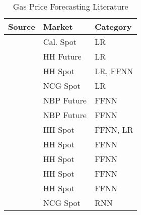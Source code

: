 \begin{table}[H]
	\begin{center}
			\begin{tabular}{l | l | l}
		 		Source & Market &  Category \\
				\hline
				\cite{woo_market_2006} &  Cal. Spot  &LR \\
				\cite{mu_weather_2007} &  HH Future  &LR \\
				\cite{malliaris_forecasting_2008} &  HH Spot  &LR, FFNN \\
				\cite{nick_what_2014} &  NCG Spot  &LR \\				
				\cite{nguyen_combining_2008} &  NBP Future  &FFNN \\
				\cite{nguyen_short-term_2010} &  NBP Future  &FFNN \\		
				\cite{abrishami_different_2011} &  HH Spot  &FFNN, LR \\
				\cite{panella_forecasting_2012} & HH Spot  & FFNN \\
				\cite{jin_forecasting_2015} & HH Spot  & FFNN \\
				\cite{ceperic_short-term_2017} & HH Spot & FFNN \\
				\cite{salehnia_forecasting_2013} & HH Spot  & FFNN \\
				\cite{busse_forecasting_2012} &  NCG Spot  & RNN \\
			\end{tabular}
	\end{center}
	\caption{Gas Price Forecasting Literature}
	\label{tab:gas_lit}
\end{table}
